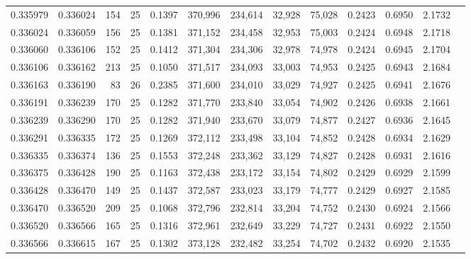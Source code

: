 \begin{tabular}{rrrrrrrrrrrrr}
0.335979 & 0.336024 &   154 &  25 &                                     0.1397 & 370,996 & 234,614 &  32,928 &  75,028 & 0.2423 & 0.6950 & 2.1732 \\
0.336024 & 0.336059 &   156 &  25 &                                     0.1381 & 371,152 & 234,458 &  32,953 &  75,003 & 0.2424 & 0.6948 & 2.1718 \\
0.336060 & 0.336106 &   152 &  25 &                                     0.1412 & 371,304 & 234,306 &  32,978 &  74,978 & 0.2424 & 0.6945 & 2.1704 \\
0.336106 & 0.336162 &   213 &  25 &                                     0.1050 & 371,517 & 234,093 &  33,003 &  74,953 & 0.2425 & 0.6943 & 2.1684 \\
0.336163 & 0.336190 &    83 &  26 &                                     0.2385 & 371,600 & 234,010 &  33,029 &  74,927 & 0.2425 & 0.6941 & 2.1676 \\
0.336191 & 0.336239 &   170 &  25 &                                     0.1282 & 371,770 & 233,840 &  33,054 &  74,902 & 0.2426 & 0.6938 & 2.1661 \\
0.336239 & 0.336290 &   170 &  25 &                                     0.1282 & 371,940 & 233,670 &  33,079 &  74,877 & 0.2427 & 0.6936 & 2.1645 \\
0.336291 & 0.336335 &   172 &  25 &                                     0.1269 & 372,112 & 233,498 &  33,104 &  74,852 & 0.2428 & 0.6934 & 2.1629 \\
0.336335 & 0.336374 &   136 &  25 &                                     0.1553 & 372,248 & 233,362 &  33,129 &  74,827 & 0.2428 & 0.6931 & 2.1616 \\
0.336375 & 0.336428 &   190 &  25 &                                     0.1163 & 372,438 & 233,172 &  33,154 &  74,802 & 0.2429 & 0.6929 & 2.1599 \\
0.336428 & 0.336470 &   149 &  25 &                                     0.1437 & 372,587 & 233,023 &  33,179 &  74,777 & 0.2429 & 0.6927 & 2.1585 \\
0.336470 & 0.336520 &   209 &  25 &                                     0.1068 & 372,796 & 232,814 &  33,204 &  74,752 & 0.2430 & 0.6924 & 2.1566 \\
0.336520 & 0.336566 &   165 &  25 &                                     0.1316 & 372,961 & 232,649 &  33,229 &  74,727 & 0.2431 & 0.6922 & 2.1550 \\
0.336566 & 0.336615 &   167 &  25 &                                     0.1302 & 373,128 & 232,482 &  33,254 &  74,702 & 0.2432 & 0.6920 & 2.1535 \\

\end{tabular}
